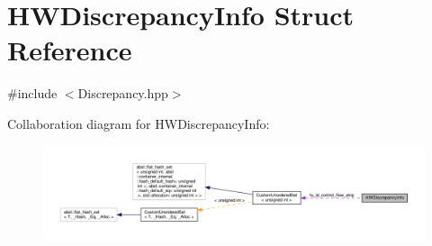 \hypertarget{structHWDiscrepancyInfo}{}\section{H\+W\+Discrepancy\+Info Struct Reference}
\label{structHWDiscrepancyInfo}


{\ttfamily \#include $<$Discrepancy.\+hpp$>$}



Collaboration diagram for H\+W\+Discrepancy\+Info\+:
\nopagebreak
\begin{figure}[H]
\begin{center}
\leavevmode
\includegraphics[width=350pt]{d3/d41/structHWDiscrepancyInfo__coll__graph}
\end{center}
\end{figure}
